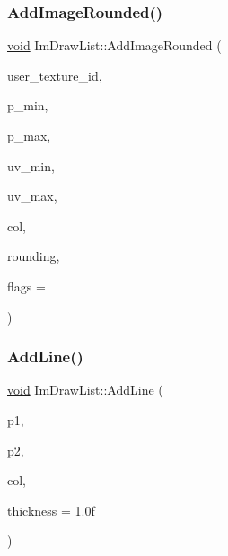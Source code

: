 \subsubsection{\texorpdfstring{Add\+Image\+Rounded()}{AddImageRounded()}}
{\footnotesize\ttfamily \hyperlink{imgui__impl__opengl3__loader_8h_ac668e7cffd9e2e9cfee428b9b2f34fa7}{void} Im\+Draw\+List\+::\+Add\+Image\+Rounded (\begin{DoxyParamCaption}\item[{Im\+Texture\+ID}]{user\+\_\+texture\+\_\+id,  }\item[{const \hyperlink{structImVec2}{Im\+Vec2} \&}]{p\+\_\+min,  }\item[{const \hyperlink{structImVec2}{Im\+Vec2} \&}]{p\+\_\+max,  }\item[{const \hyperlink{structImVec2}{Im\+Vec2} \&}]{uv\+\_\+min,  }\item[{const \hyperlink{structImVec2}{Im\+Vec2} \&}]{uv\+\_\+max,  }\item[{Im\+U32}]{col,  }\item[{float}]{rounding,  }\item[{Im\+Draw\+Flags}]{flags = {} }\end{DoxyParamCaption})}

\mbox{\label{structImDrawList_aa21e5a1c6e00239581f97d344fc0db61}} 
\subsubsection{\texorpdfstring{Add\+Line()}{AddLine()}}
{\footnotesize\ttfamily \hyperlink{imgui__impl__opengl3__loader_8h_ac668e7cffd9e2e9cfee428b9b2f34fa7}{void} Im\+Draw\+List\+::\+Add\+Line (\begin{DoxyParamCaption}\item[{const \hyperlink{structImVec2}{Im\+Vec2} \&}]{p1,  }\item[{const \hyperlink{structImVec2}{Im\+Vec2} \&}]{p2,  }\item[{Im\+U32}]{col,  }\item[{float}]{thickness = {\ttfamily 1.0f} }\end{DoxyParamCaption})}

\mbox{\label{structImDrawList_abd004dec93d106eb867c9c6554d85989}} 
